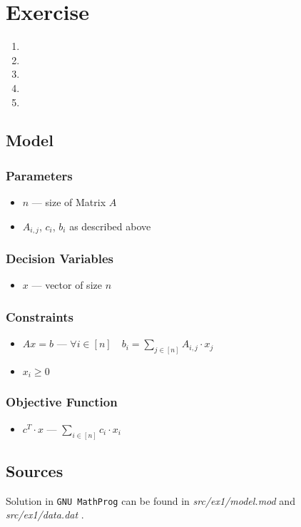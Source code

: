 \section{Exercise}
\begin{enumerate}
    \item \done
    \item \done
    \item \done
    \item \done
    \item \neverdone
\end{enumerate}

\subsection{Model}
\subsubsection*{Parameters}
\begin{itemize}
    \item $n$ --- size of Matrix $A$
    \item $A_{i,j}$\textrm{,} $c_i$\textrm{,} $b_i $ as described above
\end{itemize}
\subsubsection*{Decision Variables}
\begin{itemize}
    \item $x$ --- vector of size $n$
\end{itemize}
\subsubsection*{Constraints}
\begin{itemize}
    \item $Ax = b$ --- $\forall i \in [n] \quad b_i = \sum_{j \in [n]} A_{i,j} \cdot x_j$
    \item $x_i \geqslant 0$
\end{itemize}
\subsubsection*{Objective Function}
\begin{itemize}
    \item  $ c^T \cdot x $ --- $\sum_{i \in [n]} c_i \cdot x_i$
\end{itemize}
\subsection{Sources}
Solution in \texttt{GNU MathProg} can be found in \textit{src/ex1/model.mod} and \textit{src/ex1/data.dat} .

